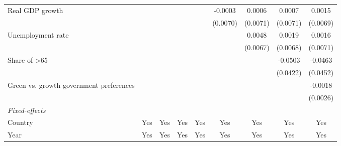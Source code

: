 \begin{table}[htbp]
\begin{tabular}{lcccccccc}
      Real GDP growth                                                                    &          &          &                &                & -0.0003        & 0.0006         & 0.0007         & 0.0015\\   
                                                                                         &          &          &                &                & (0.0070)       & (0.0071)       & (0.0071)       & (0.0069)\\   
      Unemployment rate                                                                  &          &          &                &                &                & 0.0048         & 0.0019         & 0.0016\\   
                                                                                         &          &          &                &                &                & (0.0067)       & (0.0068)       & (0.0071)\\   
      Share of >65                                                                       &          &          &                &                &                &                & -0.0503        & -0.0463\\   
                                                                                         &          &          &                &                &                &                & (0.0422)       & (0.0452)\\   
      Green vs. growth government preferences                                            &          &          &                &                &                &                &                & -0.0018\\   
                                                                                         &          &          &                &                &                &                &                & (0.0026)\\   
      \midrule
      \emph{Fixed-effects}\\
      Country                                                                            & Yes      & Yes      & Yes            & Yes            & Yes            & Yes            & Yes            & Yes\\  
      Year                                                                               & Yes      & Yes      & Yes            & Yes            & Yes            & Yes            & Yes            & Yes\\  
      \midrule

\end{tabular}
\end{table}
